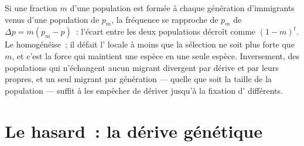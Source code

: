 \begin{proposition}\label{prop:b2:population-genetics:migration}
Si une fraction $m$ d'une population est formée à chaque génération
d'immigrants venus d'une population de  $p_{m}$, la
fréquence se rapproche de $p_{m}$ de $\Delta p = m(p_{m} - p)$~: l'écart
entre les deux populations décroît comme $(1 - m)^{t}$. Le \emph{} homogénéise~; il défait l' locale à moins que la
sélection ne soit plus forte que $m$, et c'est la force qui maintient une
espèce en une seule espèce. Inversement, des populations qui n'échangent
aucun migrant divergent par dérive et par leurs  propres, et un
seul migrant par génération --- quelle que soit la taille de la
population --- suffit à les empêcher de dériver jusqu'à la fixation
d' différents.
\end{proposition}

\section{Le hasard~: la dérive génétique}

